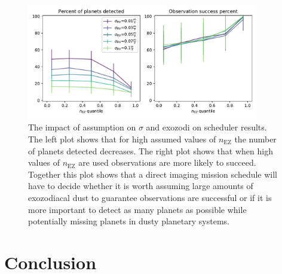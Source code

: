 \begin{figure}
  \begin{center}
    \includegraphics[width=0.9\textwidth]{ch4/figures/succes_rate_vs_percent_detected.pdf}
  \end{center}
  \caption{
    The impact of assumption on $\sigma$ and exozodi on scheduler results. The left plot shows
    that for high assumed values of $n_\textrm{EZ}$ the number of planets detected decreases.
    The right plot shows that when high values of $n_\textrm{EZ}$ are used observations are
    more likely to succeed. Together this plot shows that a direct imaging mission schedule
    will have to decide whether it is worth assuming large amounts of exozodiacal dust
    to guarantee observations are successful or if it is more important to detect as many
    planets as possible while potentially missing planets in dusty planetary systems.
  }
  \label{fig:sigma_nEZ_impact_plots}
\end{figure}

\section{Conclusion}

